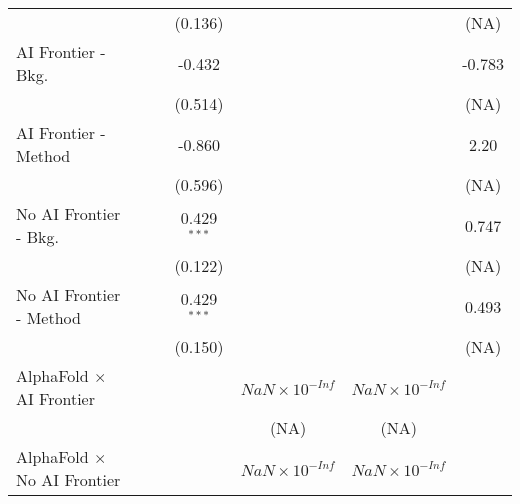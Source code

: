 \begin{tabular}{lcccccc}
                                                                              &               &               & (0.136)       &                        &                        & (NA)\\   
   AI Frontier - Bkg.                                                         &               &               & -0.432        &                        &                        & -0.783\\   
                                                                              &               &               & (0.514)       &                        &                        & (NA)\\   
   AI Frontier - Method                                                       &               &               & -0.860        &                        &                        & 2.20\\   
                                                                              &               &               & (0.596)       &                        &                        & (NA)\\   
   No AI Frontier - Bkg.                                                      &               &               & 0.429$^{***}$ &                        &                        & 0.747\\   
                                                                              &               &               & (0.122)       &                        &                        & (NA)\\   
   No AI Frontier - Method                                                    &               &               & 0.429$^{***}$ &                        &                        & 0.493\\   
                                                                              &               &               & (0.150)       &                        &                        & (NA)\\   
   AlphaFold $\times$ AI Frontier                                             &               &               &               & $NaN\times 10^{-Inf}$  & $NaN\times 10^{-Inf}$  &   \\   
                                                                              &               &               &               & (NA)                   & (NA)                   &   \\   
   AlphaFold $\times$ No AI Frontier                                          &               &               &               & $NaN\times 10^{-Inf}$  & $NaN\times 10^{-Inf}$  &   \\   

\end{tabular}

